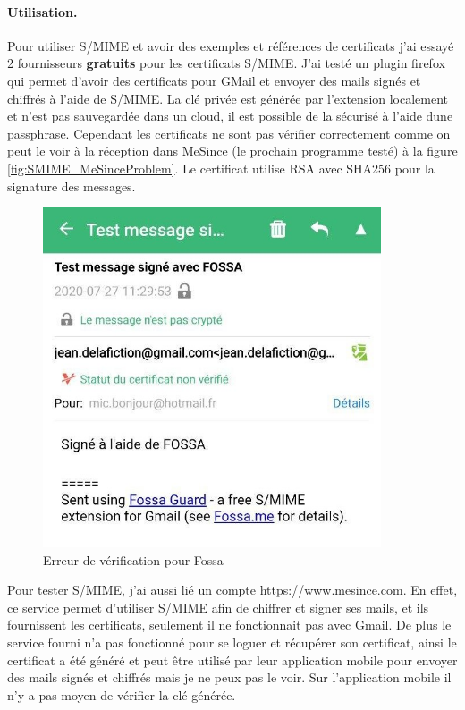 \paragraph*{Utilisation.}
Pour utiliser S/MIME et avoir des exemples et références de certificats j'ai essayé 2 fournisseurs \textbf{gratuits} pour les certificats S/MIME.
J'ai testé  un plugin firefox qui permet d'avoir des certificats pour GMail et envoyer des mails signés et chiffrés à l'aide de S/MIME. La clé privée est générée par l'extension localement et n'est pas sauvegardée dans un cloud, il est possible de la sécurisé à l'aide dune passphrase. Cependant les certificats ne sont pas vérifier correctement comme on peut le voir à la réception dans MeSince (le prochain programme testé) à la figure \ref{fig:SMIME_MeSinceProblem}. Le certificat utilise RSA avec SHA256 pour la signature des messages.
\begin{figure}[h!]
	\includegraphics[width=10cm]{images/SMIME_FossaProblem.jpg}
	\centering
	\caption{Erreur de vérification pour Fossa}
	\label{fig:SMIME_FossaProblem}
\end{figure}
 Pour tester S/MIME, j'ai aussi lié un compte \url{https://www.mesince.com}. En effet, ce service permet d'utiliser S/MIME afin de chiffrer et signer ses mails, et ils fournissent les certificats, seulement il ne fonctionnait pas avec Gmail. De plus le service fourni n'a pas fonctionné pour se loguer et récupérer son certificat, ainsi le certificat a été généré et peut être utilisé par leur application mobile pour envoyer des mails signés et chiffrés mais je ne peux pas le voir. Sur l'application mobile il n'y a pas moyen de vérifier la clé générée.
